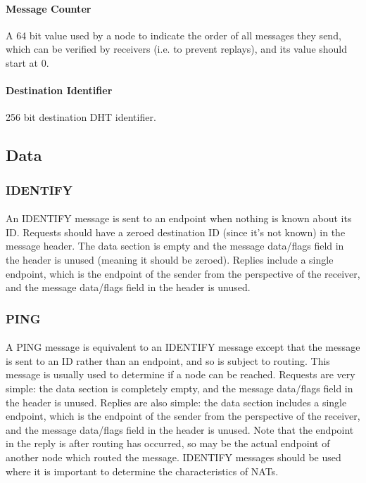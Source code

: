 \documentclass{article}
\begin{document}
\paragraph{Message Counter}
A 64 bit value used by a node to indicate the order of all messages they send, which can be verified by receivers (i.e. to prevent replays), and its value should start at 0.

\paragraph{Destination Identifier}
256 bit destination DHT identifier.

\subsection{Data}

\subsubsection{IDENTIFY}

\paragraph{}
An IDENTIFY message is sent to an endpoint when nothing is known about its ID.
Requests should have a zeroed destination ID (since it's not known) in the message header. The data section is empty and the message data/flags field in the header is unused (meaning it should be zeroed).
Replies include a single endpoint, which is the endpoint of the sender from the perspective of the receiver, and the message data/flags field in the header is unused.

\subsubsection{PING}

\paragraph{}
A PING message is equivalent to an IDENTIFY message except that the message is sent to an ID rather than an endpoint, and so is subject to routing. This message is usually used to determine if a node can be reached.
Requests are very simple: the data section is completely empty, and the message data/flags field in the header is unused.
Replies are also simple: the data section includes a single endpoint, which is the endpoint of the sender from the perspective of the receiver, and the message data/flags field in the header is unused.
Note that the endpoint in the reply is after routing has occurred, so may be the actual endpoint of another node which routed the message. IDENTIFY messages should be used where it is important to determine the characteristics of NATs.
\end{document}
